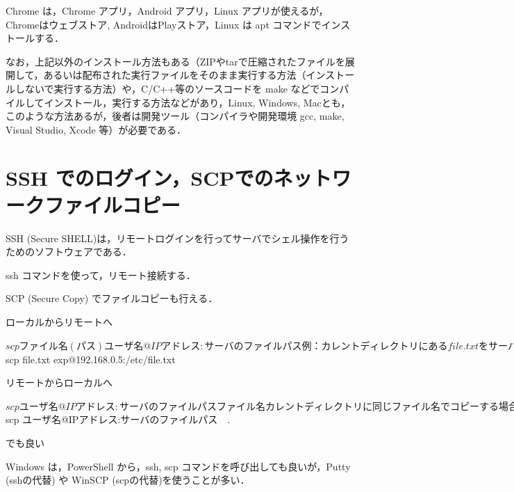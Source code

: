 Chrome は，Chrome アプリ，Android アプリ，Linux アプリが使えるが，Chromeはウェブストア, AndroidはPlayストア，Linux は apt コマンドでインストールする．

なお，上記以外のインストール方法もある（ZIPやtarで圧縮されたファイルを展開して，あるいは配布された実行ファイルをそのまま実行する方法（インストールしないで実行する方法）や，C/C++等のソースコードを make などでコンパイルしてインストール，実行する方法などがあり，Linux, Windows, Macとも，このような方法あるが，後者は開発ツール（コンパイラや開発環境 gcc, make, Visual Studio, Xcode 等）が必要である．

\section{SSH でのログイン，SCPでのネットワークファイルコピー}

SSH (Secure SHELL)は，リモートログインを行ってサーバでシェル操作を行うためのソフトウェアである．

ssh コマンドを使って，リモート接続する．


SCP (Secure Copy) でファイルコピーも行える．

\begin{cli}
ローカルからリモートへ

$ scp ファイル名(パス)  ユーザ名@IPアドレス:サーバのファイルパス

例：カレントディレクトリにある file.txt をサーバの/etc/file.txt にコピーする

$ scp file.txt  exp@192.168.0.5:/etc/file.txt

リモートからローカルへ

$ scp ユーザ名@IPアドレス:サーバのファイルパス　　ファイル名

カレントディレクトリに同じファイル名でコピーする場合は，

$ scp ユーザ名@IPアドレス:サーバのファイルパス　.

でも良い

\end{cli}

Windows は，PowerShell から，ssh, scp コマンドを呼び出しても良いが，Putty (sshの代替) や WinSCP (scpの代替)を使うことが多い．

